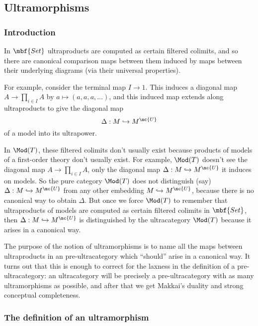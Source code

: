 \subsection{Ultramorphisms}
\subsubsection{Introduction}
In $\mbf{Set}$ ultraproducts are computed as certain filtered colimits, and so there are canonical comparison maps between them induced by maps between their underlying diagrams (via their universal properties).

For example, consider the terminal map $I \to 1$. This induces a diagonal map $A \to \prod_{i \in I} A$ by $a \mapsto (a,a,a, \dots)$, and this induced map extends along ultraproducts to give the diagonal map
$$
\Delta : M \hookrightarrow M^{\mc{U}}
$$
of a model into its ultrapower.

In $\Mod(T)$, these filtered colimits don't usually exist because products of models of a first-order theory don't usually exist. For example, $\Mod(T)$ doesn't see the diagonal map $A \to \prod_{i \in I} A$, only the diagonal map $\Delta : M \hookrightarrow M^{\mc{U}}$ it induces on models. So the pure category $\Mod(T)$ does not distinguish (say) $\Delta : M \hookrightarrow M^{\mc{U}}$ from any other embedding $M \hookrightarrow M^{\mc{U}}$, because there is no canonical way to obtain $\Delta$. But once we force $\Mod(T)$ to remember that ultraproducts of models are computed as certain filtered colimits in $\mbf{Set}$, then $\Delta : M \hookrightarrow M^{\mc{U}}$ is distinguished by the ultracategory $\Mod(T)$ because it arises in a canonical way.

The purpose of the notion of ultramorphisms is to name all the maps between ultraproducts in an pre-ultracategory which ``should'' arise in a canonical way. It turns out that this is enough to correct for the laxness in the definition of a pre-ultracategory: an ultracategory will be precisely a pre-ultracategory with as many ultramorphisms as possible, and after that we get Makkai's duality and strong conceptual completeness.

\subsubsection{The definition of an ultramorphism}

